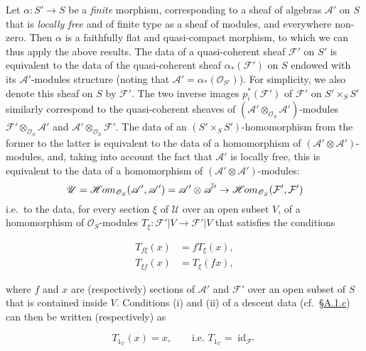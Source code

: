 \documentclass{article}
\theoremstyle{definition}
\theoremstyle{definition}
\theoremstyle{definition}
\theoremstyle{definition}
\theoremstyle{remark}
\begin{document}
Let \(\alpha\colon S'\to S\) be a \emph{finite} morphism, corresponding to a sheaf of algebras \({\mathscr{A}}'\) on \(S\) that is \emph{locally free} and of finite type as a sheaf of modules, and everywhere non-zero.
Then \(\alpha\) is a faithfully flat and quasi-compact morphism, to which we can thus apply the above results.
The data of a quasi-coherent sheaf \({\mathcal{F}}'\) on \(S'\) is equivalent to the data of the quasi-coherent sheaf \(\alpha_*({\mathcal{F}}')\) on \(S\) endowed with its \({\mathscr{A}}'\)-modules structure (noting that \({\mathscr{A}}'=\alpha_*({\mathscr{O}}_{S'})\)).
For simplicity, we also denote this sheaf on \(S\) by \({\mathcal{F}}'\).
The two inverse images \(p_i^*({\mathcal{F}}')\) of \({\mathcal{F}}'\) on \(S'\times_S S'\) similarly correspond to the quasi-coherent sheaves of \(({\mathscr{A}}'\otimes_{{\mathscr{O}}_S}{\mathscr{A}}')\)-modules \({\mathcal{F}}'\otimes_{{\mathscr{O}}_S}{\mathscr{A}}'\) and \({\mathscr{A}}'\otimes_{{\mathscr{O}}_S}{\mathcal{F}}'\).
The data of an \((S'\times_S S')\)-homomorphism from the former to the latter is equivalent to the data of a homomorphism of \(({\mathscr{A}}'\otimes{\mathscr{A}}')\)-modules, and, taking into account the fact that \({\mathscr{A}}'\) is locally free, this is equivalent to the data of a homomorphism of \(({\mathscr{A}}'\otimes{\mathscr{A}}')\)-modules:
\[
  {\mathscr{U}}
  = \mathscr{H}\kern -.5pt om_{{\mathscr{O}}_S}({\mathscr{A}}',{\mathscr{A}}')
  = {\mathscr{A}}'\otimes\check{{\mathscr{A}}}'
  \to \mathscr{H}\kern -.5pt om_{{\mathscr{O}}_S}({\mathcal{F}}',{\mathcal{F}}')
\]
i.e.~to the data, for every section \(\xi\) of \({\mathscr{U}}\) over an open subset \(V\), of a homomorphism of \({\mathscr{O}}_S\)-modules \(T_\xi\colon{\mathcal{F}}'|V\to{\mathcal{F}}'|V\) that satisfies the conditions

\leavevmode{}%
\[
  \begin{aligned}
    T_{f\xi}(x) &= fT_\xi(x),
  \\T_{\xi f}(x) &= T_\xi(fx),
  \end{aligned}
\tag{3.1}
\]

where \(f\) and \(x\) are (respectively) sections of \({\mathscr{A}}'\) and \({\mathcal{F}}'\) over an open subset of \(S\) that is contained inside \(V\).
Conditions (i) and (ii) of a descent data (cf.~\protect\hyperlink{fga-3-i-section-A.1.c}{§A.1.c}) can then be written (respectively) as

\leavevmode{}%
\[
  T_{1_U}(x) = x,
  \qquad\text{i.e. }T_{1_U}=\operatorname{id}_{{\mathcal{F}}'}
\tag{3.2}
\]
\end{document}
